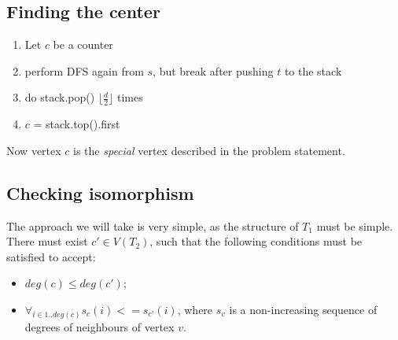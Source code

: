 \documentclass[11pt]{article}
\begin{document}
\subsection{Finding the center}
\begin{enumerate}
    \item Let $c$ be a counter
    \item perform DFS again from $s$, but break after pushing $t$ to the stack
    \item do stack.pop() $\lfloor \frac{d}{2} \rfloor$ times
    \item $c$ = stack.top().first
\end{enumerate}

Now vertex $c$ is the \emph{special} vertex described in the problem statement.

\subsection{Checking isomorphism}
The approach we will take is very simple, as the structure of $T_1$ must be
simple. There must exist $c' \in V(T_2)$, such that the following conditions
must be satisfied to accept:
\begin{itemize}
    \item $deg(c) \le deg(c')$;
    \item $\forall_{i \in 1..deg(c)} s_c(i) <= s_{c'}(i)$, where $s_v$ is
        a non-increasing sequence of degrees of neighbours of vertex $v$.
\end{itemize}
\end{document}
